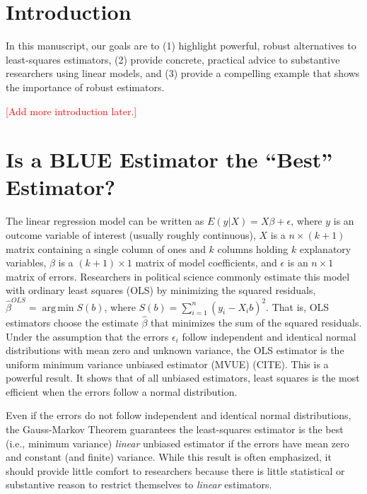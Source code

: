 \documentclass[12pt]{article}
\DeclareMathOperator*{\argmin}{arg\,min}
\newcommand{\ctk}[1]{\textcolor{red}{#1}}
\begin{document}


\thispagestyle{empty}

\newpage
\doublespace

\section*{Introduction}

In this manuscript, our goals are to (1) highlight powerful, robust alternatives to least-squares estimators, (2) provide concrete, practical advice to substantive researchers using linear models, and (3) provide a compelling example that shows the importance of robust estimators.

\ctk{[Add more introduction later.]}

\section*{Is a BLUE Estimator the ``Best'' Estimator?}

The linear regression model can be written as $E(y | X) = X\beta + \epsilon$, where $y$ is an outcome variable of interest (usually roughly continuous), $X$ is a $n \times (k + 1)$ matrix containing a single column of ones and $k$ columns holding $k$ explanatory variables, $\beta$ is a $(k + 1) \times 1$ matrix of model coefficients, and $\epsilon$ is an $n \times 1$ matrix of errors. Researchers in political science commonly estimate this model with ordinary least squares (OLS) by minimizing the squared residuals, $\hat{\beta}^{OLS} = \argmin S(b)$, where $S(b) = \sum_{i = 1}^n(y_i - X_ib)^2$. That is, OLS estimators choose the estimate $\hat{\beta}$ that minimizes the sum of the squared residuals. Under the assumption that the errors $\epsilon_i$ follow independent and identical normal distributions with mean zero and unknown variance, the OLS estimator is the uniform minimum variance unbiased estimator (MVUE) (CITE).
This is a powerful result. It shows that of all unbiased estimators, least squares is the most efficient when the errors follow a normal distribution.

Even if the errors do not follow independent and identical normal distributions, the Gauss-Markov Theorem guarantees the least-squares estimator is the best (i.e., minimum variance) \textit{linear} unbiased estimator if the errors have mean zero and constant (and finite) variance. While this result is often emphasized, it should provide little comfort to researchers because there is little statistical or substantive reason to restrict themselves to \textit{linear} estimators.
\end{document}

